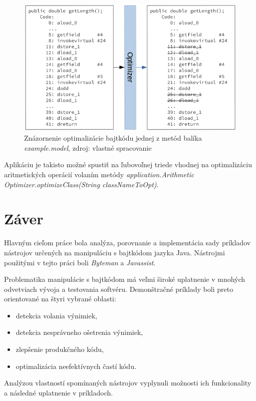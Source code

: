 \documentclass[11pt,final,oneside]{fithesis}
\begin{document}
\begin{figure}[h]
  \centering
   \includegraphics[width=\textwidth]{optimizer.png}
  \caption{Znázornenie optimalizácie bajtkódu jednej z metód balíka
  \textit{example.model}, zdroj: vlastné spracovanie}
  \label{fig:opt}
\end{figure}

Aplikáciu je takisto možné spustiť na ľubovoľnej triede vhodnej na 
optimalizáciu aritmetických operácií volaním metódy
\textit{application.Arithmetic Optimizer.optimizeClass(String classNameToOpt)}.

\chapter{Záver}

Hlavným cieľom práce bola analýza, porovnanie a implementácia sady príkladov
nástrojov určených na manipuláciu s bajtkódom jazyka Java. Nástrojmi použitými
v tejto práci boli \textit{Byteman} a \textit{Javassist}. 

Problematika manipulácie s bajtkódom má veľmi široké uplatnenie v mnohých
odvetviach vývoja a testovania softvéru. Demonštračné príklady boli preto
orientované na štyri vybrané oblasti:

\begin{itemize}
\item detekcia volania výnimiek,
\item detekcia nesprávneho ošetrenia výnimiek,
\item zlepšenie produkčného kódu,
\item optimalizácia neefektívnych častí kódu.
\end{itemize}

Analýzou vlastností spomínaných nástrojov vyplynuli možnosti ich funkcionality
a následné uplatnenie v príkladoch. 
\end{document}
